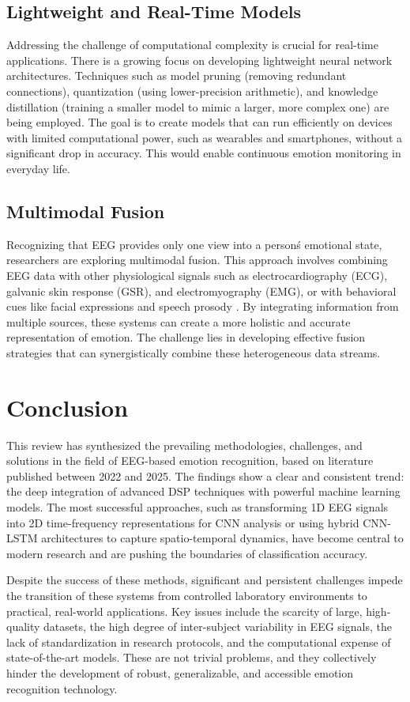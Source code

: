 \documentclass[conference]{IEEEtran}
\begin{document}
\subsection*{Lightweight and Real-Time Models}
Addressing the challenge of computational complexity is crucial for real-time applications. There is a growing focus on developing lightweight neural network architectures. Techniques such as model pruning (removing redundant connections), quantization (using lower-precision arithmetic), and knowledge distillation (training a smaller model to mimic a larger, more complex one) are being employed. The goal is to create models that can run efficiently on devices with limited computational power, such as wearables and smartphones, without a significant drop in accuracy. This would enable continuous emotion monitoring in everyday life.

\subsection*{Multimodal Fusion}
Recognizing that EEG provides only one view into a person\'s emotional state, researchers are exploring multimodal fusion. This approach involves combining EEG data with other physiological signals such as electrocardiography (ECG), galvanic skin response (GSR), and electromyography (EMG), or with behavioral cues like facial expressions and speech prosody \cite{b6, b8}. By integrating information from multiple sources, these systems can create a more holistic and accurate representation of emotion. The challenge lies in developing effective fusion strategies that can synergistically combine these heterogeneous data streams.

\section{Conclusion}
This review has synthesized the prevailing methodologies, challenges, and solutions in the field of EEG-based emotion recognition, based on literature published between 2022 and 2025. The findings show a clear and consistent trend: the deep integration of advanced DSP techniques with powerful machine learning models. The most successful approaches, such as transforming 1D EEG signals into 2D time-frequency representations for CNN analysis or using hybrid CNN-LSTM architectures to capture spatio-temporal dynamics, have become central to modern research and are pushing the boundaries of classification accuracy.

Despite the success of these methods, significant and persistent challenges impede the transition of these systems from controlled laboratory environments to practical, real-world applications. Key issues include the scarcity of large, high-quality datasets, the high degree of inter-subject variability in EEG signals, the lack of standardization in research protocols, and the computational expense of state-of-the-art models. These are not trivial problems, and they collectively hinder the development of robust, generalizable, and accessible emotion recognition technology.
\end{document}

